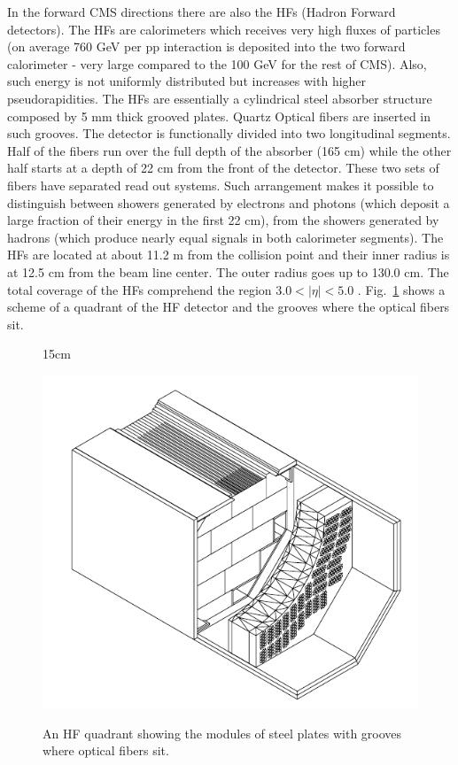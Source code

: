 In the forward CMS directions there are also the HFs (Hadron Forward detectors). The HFs are calorimeters which receives very high fluxes of particles (on average 760 GeV per pp interaction is deposited into the two forward calorimeter - very large compared to the 100 GeV for the rest of CMS). Also, such energy is not uniformly distributed but increases with higher pseudorapidities. The HFs are essentially a cylindrical steel absorber structure composed by 5 mm thick grooved plates. Quartz Optical fibers are inserted in such grooves. The detector is functionally divided into two longitudinal segments. Half of the fibers run over the full depth of the absorber (165 cm) while the other half starts at a depth of 22 cm from the front of the detector. These two sets of fibers have separated read out systems. Such arrangement makes it possible to distinguish between showers generated by electrons and photons (which deposit a large fraction of their energy in the first 22 cm), from the showers generated by hadrons (which produce nearly equal signals in both calorimeter segments). The HFs are located at about 11.2 m from the collision point and their inner radius is at 12.5 cm from the beam line center. The outer radius goes up to 130.0 cm. The total coverage of the HFs comprehend the region $3.0 < |\eta| < 5.0$ \cite{bib:JINST-3-362-2008,bib:hcal-tdr-1997}. Fig.~\ref{fig:hcal_hf} shows a scheme of a quadrant of the HF detector and the grooves where the optical fibers sit.

\begin{figure}[htbp]{15cm}
	\caption{An HF quadrant showing the modules of steel plates with grooves where optical fibers sit.}
	\includegraphics[scale=0.5]{ChapterCMS/figs/hcal_hf.png}
	\label{fig:hcal_hf}
\end{figure}


